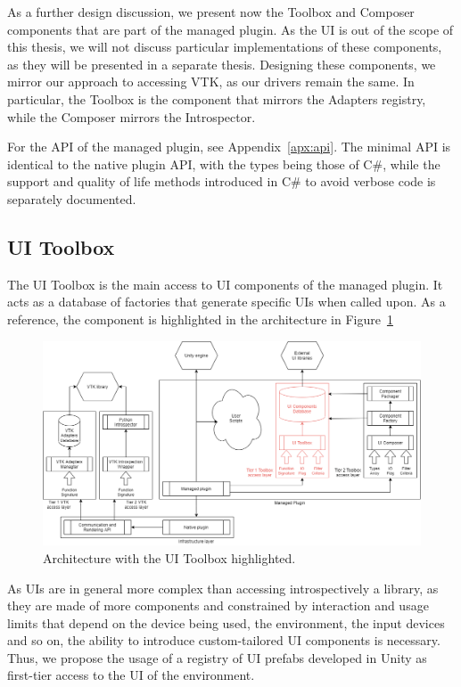 As a further design discussion, we present now the Toolbox and Composer components that are part of the managed plugin. As the UI is out of the scope of this thesis, we will not discuss particular implementations of these components, as they will be presented in a separate thesis. Designing these components, we mirror our approach to accessing VTK, as our drivers remain the same. In particular, the Toolbox is the component that mirrors the Adapters registry, while the Composer mirrors the Introspector.

For the API of the managed plugin, see Appendix~\ref{apx:api}. The minimal API is identical to the native plugin API, with the types being those of C\#, while the support and quality of life methods introduced in C\# to avoid verbose code is separately documented.

\subsection{UI Toolbox}
\label{sec:design-toolbox}

The UI Toolbox is the main access to UI components of the managed plugin. It acts as a database of factories that generate specific UIs when called upon. As a reference, the component is highlighted in the architecture in Figure~\ref{fig:arch-toolbox}

\begin{figure}
    \centering
    \includegraphics[width=\textwidth]{pictures/Architecture-v0.3-toolbox.png}
    \caption{Architecture with the UI Toolbox highlighted.}
    \label{fig:arch-toolbox}
\end{figure}

As UIs are in general more complex than accessing introspectively a library, as they are made of more components and constrained by interaction and usage limits that depend on the device being used, the environment, the input devices and so on, the ability to introduce custom-tailored UI components is necessary. Thus, we propose the usage of a registry of UI prefabs developed in Unity as first-tier access to the UI of the environment.

